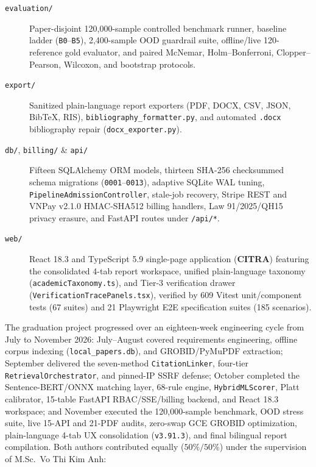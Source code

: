 \begin{description}
    \item[\texttt{evaluation/}] Paper-disjoint 120,000-sample controlled benchmark runner, baseline ladder (\texttt{B0}--\texttt{B5}), 2,400-sample OOD guardrail suite, offline/live 120-reference gold evaluator, and paired McNemar, Holm--Bonferroni, Clopper--Pearson, Wilcoxon, and bootstrap protocols.
    \item[\texttt{export/}] Sanitized plain-language report exporters (PDF, DOCX, CSV, JSON, BibTeX, RIS), \texttt{bibliography\_formatter.py}, and automated \texttt{.docx} bibliography repair (\texttt{docx\_exporter.py}).
    \item[\texttt{db/}, \texttt{billing/} \& \texttt{api/}] Fifteen SQLAlchemy ORM models, thirteen SHA-256 checksummed schema migrations (\texttt{0001}--\texttt{0013}), adaptive SQLite WAL tuning, \texttt{PipelineAdmissionController}, stale-job recovery, Stripe REST and VNPay v2.1.0 HMAC-SHA512 billing handlers, Law 91/2025/QH15 privacy erasure, and FastAPI routes under \texttt{/api/*}.
    \item[\texttt{web/}] React 18.3 and TypeScript 5.9 single-page application (\textbf{CITRA}) featuring the consolidated 4-tab report workspace, unified plain-language taxonomy (\texttt{academic\allowbreak{}Taxonomy.ts}), and Tier-3 verification drawer (\texttt{Verification\allowbreak{}Trace\allowbreak{}Panels.tsx}), verified by 609 Vitest unit/component tests (67 suites) and 21 Playwright E2E specification suites (185 scenarios).
\end{description}


The graduation project progressed over an eighteen-week engineering cycle from July to November 2026: July--August covered requirements engineering, offline corpus indexing (\texttt{local\_papers.db}), and GROBID/PyMuPDF extraction; September delivered the seven-method \texttt{CitationLinker}, four-tier \texttt{RetrievalOrchestrator}, and pinned-IP SSRF defense; October completed the Sentence-BERT/ONNX matching layer, 68-rule engine, \texttt{HybridMLScorer}, Platt calibrator, 15-table FastAPI RBAC/SSE/billing backend, and React 18.3 workspace; and November executed the 120,000-sample benchmark, OOD stress suite, live 15-API and 21-PDF audits, zero-swap GCE GROBID optimization, plain-language 4-tab UX consolidation (\texttt{v3.91.3}), and final bilingual report compilation. Both authors contributed equally ($50\% / 50\%$) under the supervision of M.Sc.\ Vo Thi Kim Anh:

